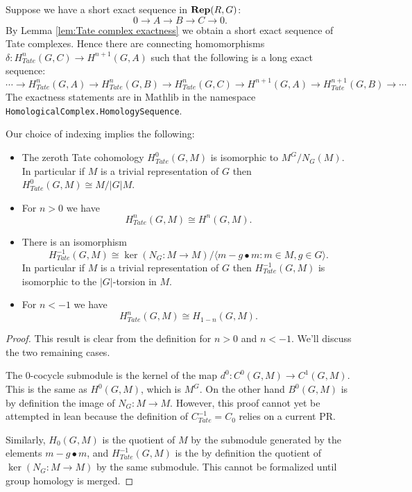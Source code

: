 \begin{definition} \label{def:Tate long exact sequence}
	\leanok
	Suppose we have a short exact sequence in $\mathbf{Rep}(R,G)$:
	\[
		0 \to A \to B \to C \to 0.
	\]
	By Lemma \ref{lem:Tate complex exactness} we obtain a short exact sequence of Tate complexes.
	Hence there are connecting homomorphisms $\delta : H^n_{Tate}(G,C) \to H^{n+1}(G,A)$
	such that the following is a long exact sequence:
	\[
		\cdots \to H^n_{Tate}(G,A) \to H^n_{Tate}(G,B) \to H^n_{Tate}(G,C)
		\to H^{n+1}(G,A) \to H^{n+1}_{Tate}(G,B) \to \cdots
	\]
	The exactness statements are in Mathlib in the namespace
	\texttt{HomologicalComplex.HomologySequence}.
\end{definition}

Our choice of indexing implies the following:

\begin{lemma}	\label{lem:Tate cohomology is cohomology or homology}
	\leanok
	\begin{itemize}
		\item
		The zeroth Tate cohomology $H^0_{Tate}(G,M)$ is isomorphic to $M^G / N_G(M)$.
		In particular if $M$ is a trivial representation of $G$ then
		$H^0_{Tate}(G,M) \cong M / |G|M$.
		\item
		For $n >0 $ we have
		\[
			H^{n}_{Tate}(G,M) \cong H^{n} (G,M).
		\]
		\item
		There is an isomorphism
		\[
			H^{-1}_{Tate}(G,M) \cong \ker (N_G : M \to M ) /
			\langle {m - g \bullet m : m \in M, g \in G}\rangle.
		\]
		In particular if $M$ is a trivial representation of $G$ then
		$H^{-1}_{Tate}(G,M)$ is isomorphic to the $|G|$-torsion in $M$.
		\item
		For $n < -1$ we have
		\[
			H^{n}_{Tate}(G,M) \cong H_{1-n} (G,M).
		\]
	\end{itemize}
\end{lemma}

\begin{proof}
	This result is clear from the definition for $n > 0$ and $n < -1$. We'll discuss
	the two remaining cases.

	The $0$-cocycle submodule is the kernel of the map $d^0 : C^0(G,M) \to C^1(G,M)$.
	This is the same as $H^0(G,M)$, which is $M^G$.
	On the other hand $B^0(G,M)$ is by definition the image of $N_G : M \to M$.
	However, this proof cannot yet be attempted in lean because the definition of
	$C^{-1}_{Tate} = C_0$ relies on a current PR.

	Similarly, $H_0(G,M)$ is the quotient of $M$ by
	the submodule generated by the elements $m - g \bullet m$, and $H^{-1}_{Tate}(G,M)$
	is the by definition the quotient of $\ker(N_G : M \to M)$ by the same submodule.
	This cannot be formalized until group homology is merged.
\end{proof}



